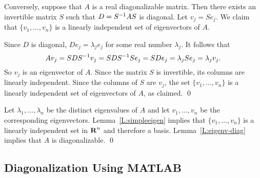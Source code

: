 Conversely, suppose that $A$ is a real diagonalizable matrix.  Then there
exists an invertible matrix $S$ such that $D=S^{-1} AS$ is diagonal.  Let
$v_j = Se_j$.  We claim that $\{v_1,\ldots,v_n\}$ is a linearly independent 
set of eigenvectors of $A$.

Since $D$ is diagonal, $De_j=\lambda_je_j$ for some real number $\lambda_j$. 
It follows that
\[
Av_j = SDS^{-1} v_j = SDS^{-1} Se_j = SDe_j = \lambda_j Se_j = \lambda_jv_j.
\]  
So $v_j$ is an eigenvector of $A$.  Since the matrix $S$ is invertible, its
columns are linearly independent.  Since the columns of $S$ are $v_j$, the
set $\{v_1,\ldots,v_n\}$ is a linearly independent set of eigenvectors of
$A$, as claimed. \qed



 Let
$\lambda_1,\ldots,\lambda_n$ be the distinct eigenvalues of 
$A$ and let $v_1,\ldots,v_n$ be the corresponding eigenvectors.
Lemma~\ref{L:simpleeigen} implies that $\{v_1,\ldots,v_n\}$ is 
a linearly independent set in $\mbox{$\bf{R}$}^n$ and therefore a basis.
Lemma~\ref{L:eigenv-diag} implies that $A$ is diagonalizable.  \qed

\subsection*{Diagonalization Using MATLAB}

